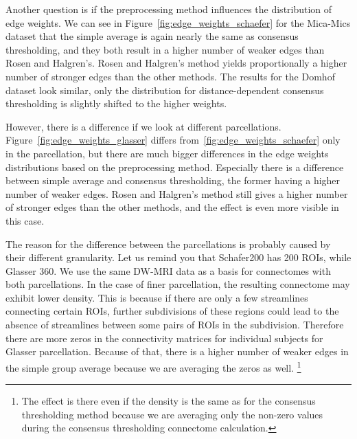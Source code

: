 Another question is if the preprocessing method influences the distribution of edge weights. We can see in Figure~\ref{fig:edge_weights_schaefer} for the Mica-Mics dataset that the simple average is again nearly the same as consensus thresholding, and they both result in a higher number of weaker edges than Rosen and Halgren's. Rosen and Halgren's method yields proportionally a higher number of stronger edges than the other methods. The results for the Domhof dataset look similar, only the distribution for distance-dependent consensus thresholding is slightly shifted to the higher weights.

However, there is a difference if we look at different parcellations. Figure~\ref{fig:edge_weights_glasser} differs from~\ref{fig:edge_weights_schaefer} only in the parcellation, but there are much bigger differences in the edge weights distributions based on the preprocessing method. Especially there is a difference between simple average and consensus thresholding, the former having a higher number of weaker edges. Rosen and Halgren's method still gives a higher number of stronger edges than the other methods, and the effect is even more visible in this case.

The reason for the difference between the parcellations is probably caused by their different granularity. Let us remind you that Schafer200 has 200 ROIs, while Glasser 360. We use the same DW-MRI data as a basis for connectomes with both parcellations. In the case of finer parcellation, the resulting connectome may exhibit lower density. This is because if there are only a few streamlines connecting certain ROIs, further subdivisions of these regions could lead to the absence of streamlines between some pairs of ROIs in the subdivision. Therefore there are more zeros in the connectivity matrices for individual subjects for Glasser parcellation. Because of that, there is a higher number of weaker edges in the simple group average because we are averaging the zeros as well. \footnote{The effect is there even if the density is the same as for the consensus thresholding method because we are averaging only the non-zero values during the consensus thresholding connectome calculation.}

